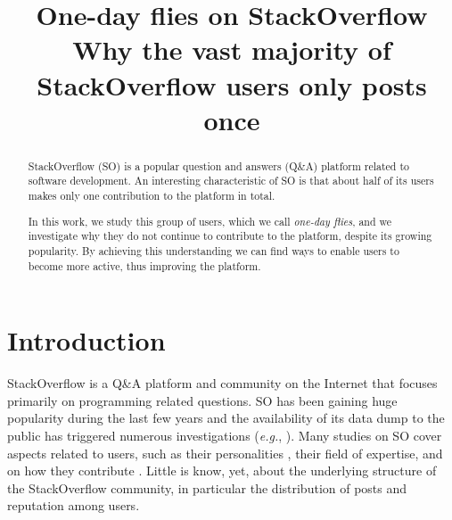 \documentclass[conference]{IEEEtran}
\newcommand{\eg}{\emph{e.g.},\xspace}
\newcommand\odf{\emph{one-day flies}\xspace}
\begin{document}
\title{One-day flies on StackOverflow\\
{\LARGE Why the vast majority of StackOverflow users only posts once}}



\author{
}





\maketitle


\begin{abstract}


StackOverflow (SO) is a popular question and answers (Q\&A) platform related to
software development. An interesting characteristic of SO is that about 
half of its users makes only one contribution to the platform in total.

In this work, we study this group of users, which we call \odf, and we 
investigate why they do not continue to contribute to the platform, despite its
growing popularity. By achieving this understanding we can find ways to enable
users to become more active, thus improving the platform. 
\end{abstract}

\IEEEpeerreviewmaketitle



\section{Introduction}

StackOverflow is a Q\&A platform and community on the Internet that focuses
primarily on programming related questions. SO has been gaining huge popularity
during the last few years \cite{anderson2012discovering} and the availability
of its data dump to the public has triggered numerous investigations (\eg
\cite{treude2011programmers,barua2014developers,morrison2013age}).  Many
studies on SO cover aspects related to users, such as their personalities
\cite{bosu2013building}, their field of expertise, and on how they contribute
\cite{movshovitz2013analysis}. Little is know, yet, about the underlying
structure of the StackOverflow community, in particular the distribution of
posts and reputation among users.
\end{document}
